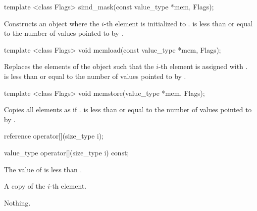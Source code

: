 \begin{itemdecl}
template <class Flags> simd_mask(const value_type *mem, Flags);
\end{itemdecl}
\begin{itemdescr}
  \pnum\effects Constructs an object where the $i$-th element is initialized to  \foralli.
  \pnum\requires {} is less than or equal to the number of values pointed to by .
  \flagsRemarks{\mask{}}
\end{itemdescr}

\begin{itemdecl}
template <class Flags> void memload(const value_type *mem, Flags);
\end{itemdecl}
\begin{itemdescr}
  \pnum\effects Replaces the elements of the \mask object such that the $i$-th element is assigned with  \foralli.
  \pnum\requires {} is less than or equal to the number of values pointed to by .
  \flagsRemarks{\mask{}}
\end{itemdescr}

\begin{itemdecl}
template <class Flags> void memstore(value_type *mem, Flags);
\end{itemdecl}
\begin{itemdescr}
  \pnum\effects Copies all \mask elements as if  \foralli.
  \pnum\requires {} is less than or equal to the number of values pointed to by .
  \flagsRemarks{\mask{}}
\end{itemdescr}

\begin{itemdecl}
reference operator[](size_type i);
\end{itemdecl}
\begin{itemdescr}
  \simdElementReference{\mask{}}
\end{itemdescr}

\begin{itemdecl}
value_type operator[](size_type i) const;
\end{itemdecl}
\begin{itemdescr}
  \pnum\requires The value of  is less than .

  \pnum\returns A copy of the $i$-th element.

  \pnum\throws Nothing.
\end{itemdescr}

